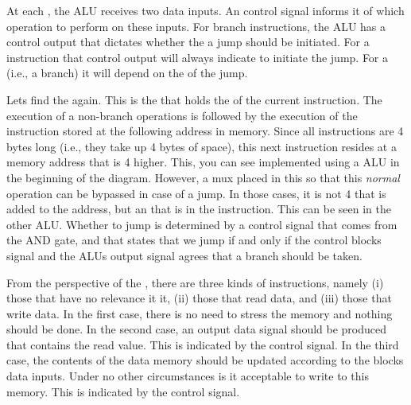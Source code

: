 At each , the ALU receives two data inputs. An  control signal informs it of which operation to perform on these inputs. For branch instructions, the ALU has a control output that dictates whether the a jump should be initiated. For a  instruction that control output will always indicate to initiate the jump. For a  (i.e., a branch) it will depend on the  of the jump.

Lets find the  again. This is the  that holds the  of the current instruction. The execution of a non-branch operations is followed by the execution of the instruction stored at the following address in memory. Since all instructions are 4 bytes long (i.e., they take up 4 bytes of space), this next instruction resides at a memory address that is 4 higher. This, you can see implemented using a \say{+} ALU in the beginning of the diagram. However, a mux placed in this so that this \textsl{normal} operation can be bypassed in case of a jump. In those cases, it is not 4 that is added to the address, but an  that is  in the instruction. This can be seen in the other \say{+} ALU. Whether to jump is determined by a control signal that comes from the AND gate, and that states that we jump if and only if the control blocks  signal and the ALUs output signal agrees that a branch should be taken.

From the perspective of the , there are three kinds of instructions, namely (i) those that have no relevance it it, (ii) those that read data, and (iii) those that write data. In the first case, there is no need to stress the memory and nothing should be done. In the second case, an output data signal should be produced that contains the read value. This is indicated by the  control signal. In the third case, the contents of the data memory should be updated according to the blocks data inputs. Under no other circumstances is it acceptable to write to this memory. This is indicated by the  control signal.

